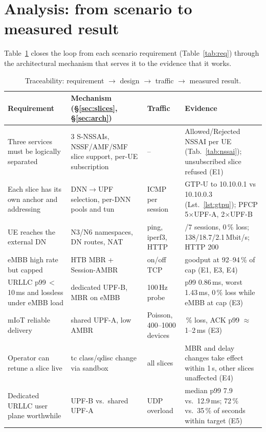 \section{Analysis: from scenario to measured result}\label{sec:analysis}
Table~\ref{tab:thread} closes the loop from each scenario requirement (Table~\ref{tab:req})
through the architectural mechanism that serves it to the evidence that it works.

\begin{table}[H]\centering\footnotesize
\caption{Traceability: requirement $\rightarrow$ design $\rightarrow$ traffic $\rightarrow$ measured result.}\label{tab:thread}
\begin{tabularx}{\linewidth}{>{\raggedright}p{3.0cm}>{\raggedright}p{3.6cm}>{\raggedright}p{2.5cm}>{\raggedright\arraybackslash}X}
\toprule
Requirement & Mechanism (\S\ref{sec:slices}, \S\ref{sec:arch}) & Traffic & Evidence\\
\midrule
Three services must be logically separated & 3 S-NSSAIs, NSSF/AMF/SMF slice support, per-UE subscription & -- & Allowed/Rejected NSSAI per UE (Tab.~\ref{tab:nssai}); unsubscribed slice refused (E1)\\
Each slice has its own anchor and addressing & DNN$\rightarrow$UPF selection, per-DNN pools and tun & ICMP per session & GTP-U to 10.10.0.1 vs 10.10.0.3 (Lst.~\ref{lst:gtpu}); PFCP 5$\times$UPF-A, 2$\times$UPF-B\\
UE reaches the external DN & N3/N6 namespaces, DN routes, NAT & ping, iperf3, HTTP & 7/7 sessions, 0\,\% loss; 138/18.7/2.1\,Mbit/s; HTTP 200\\
eMBB high rate but capped & HTB MBR + Session-AMBR & on/off TCP & goodput at 92--94\,\% of cap (E1, E3, E4)\\
URLLC p99\,$<$\,10\,ms and lossless under eMBB load & dedicated UPF-B, MBR on eMBB & 100\,Hz probe & p99 0.86\,ms, worst 1.43\,ms, 0\,\% loss while eMBB at cap (E3)\\
mIoT reliable delivery & shared UPF-A, low AMBR & Poisson, 400--1000 devices & 0\,\% loss, ACK p99 $\approx$1--2\,ms (E3)\\
Operator can retune a slice live & tc class/qdisc change via sandbox & all slices & MBR and delay changes take effect within 1\,s, other slices unaffected (E4)\\
Dedicated URLLC user plane worthwhile & UPF-B vs.\ shared UPF-A & UDP overload & median p99 7.9 vs.\ 12.9\,ms; 72\,\% vs.\ 35\,\% of seconds within target (E5)\\
\bottomrule
\end{tabularx}
\end{table}

